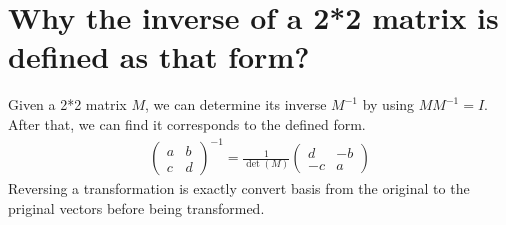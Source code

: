 \documentclass[12pt]{article}
\begin{document}
\section{Why the inverse of a 2*2 matrix is defined as that form?}
Given a 2*2 matrix $M$, we can determine its inverse $M^{-1}$ by using $MM^{-1} = I$. \\
After that, we can find it corresponds to the defined form. \\
\begin{align*}
\begin{pmatrix} a & b \\ c & d \end{pmatrix} ^{-1} = \frac{1}{\det(M)} \begin{pmatrix} d & -b \\ -c & a \end{pmatrix}
\end{align*}
Reversing a transformation is exactly convert basis from the original to the priginal vectors before being transformed.
\end{document}
